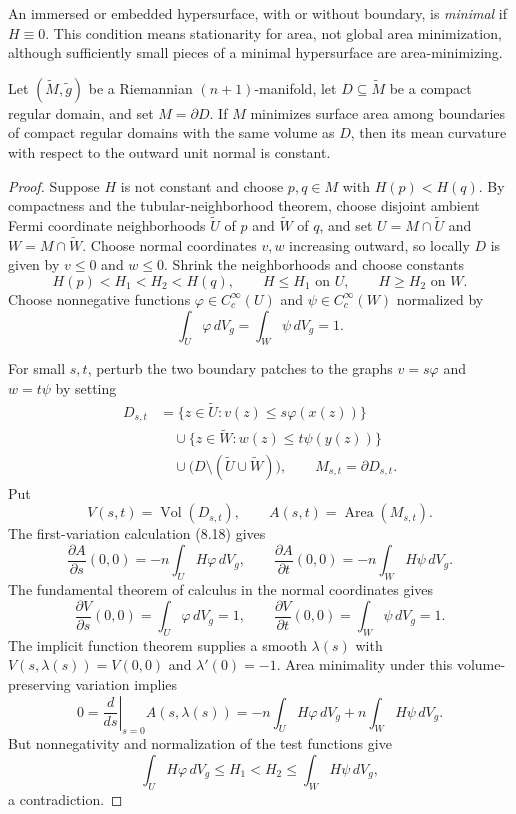 An immersed or embedded hypersurface, with or without boundary, is
\emph{minimal} if $H\equiv0$. This condition means stationarity for area, not
global area minimization, although sufficiently small pieces of a minimal
hypersurface are area-minimizing.

\begin{theorem}
\label{thm:constant-mean-curvature-isoperimetric}

Let $(\widetilde M,\widetilde g)$ be a Riemannian $(n+1)$-manifold, let
$D\subseteq\widetilde M$ be a compact regular domain, and set $M=\partial D$.
If $M$ minimizes surface area among boundaries of compact regular domains with
the same volume as $D$, then its mean curvature with respect to the outward
unit normal is constant.
\end{theorem}

\begin{proof}
\sketch Suppose $H$ is not constant and choose $p,q\in M$ with
$H(p)<H(q)$. By compactness and the tubular-neighborhood theorem, choose
disjoint ambient Fermi coordinate neighborhoods $\widetilde U$ of $p$ and
$\widetilde W$ of $q$, and set
$U=M\cap\widetilde U$ and $W=M\cap\widetilde W$. Choose normal coordinates
$v,w$ increasing outward, so locally $D$ is given by $v\leq0$ and $w\leq0$.
Shrink the neighborhoods and choose constants
\[
H(p)<H_1<H_2<H(q),
\qquad H\leq H_1\text{ on }U,
\qquad H\geq H_2\text{ on }W.
\]
Choose nonnegative functions
$\varphi\in C_c^\infty(U)$ and $\psi\in C_c^\infty(W)$ normalized by
\[
\int_U\varphi\,dV_g=\int_W\psi\,dV_g=1.
\]

For small $s,t$, perturb the two boundary patches to the graphs
$v=s\varphi$ and $w=t\psi$ by setting
\begin{align*}
D_{s,t}
&=\{z\in\widetilde U:v(z)\leq s\varphi(x(z))\}\\
&\quad\cup\{z\in\widetilde W:w(z)\leq t\psi(y(z))\}\\
&\quad\cup\bigl(D\setminus(\widetilde U\cup\widetilde W)\bigr),
\qquad M_{s,t}=\partial D_{s,t}.
\end{align*}
Put
\[
V(s,t)=\operatorname{Vol}(D_{s,t}),
\qquad A(s,t)=\operatorname{Area}(M_{s,t}).
\]
The first-variation calculation (8.18) gives
\[
\frac{\partial A}{\partial s}(0,0)
=-n\int_UH\varphi\,dV_g,
\qquad
\frac{\partial A}{\partial t}(0,0)
=-n\int_WH\psi\,dV_g.
\]
The fundamental theorem of calculus in the normal coordinates gives
\[
\frac{\partial V}{\partial s}(0,0)
=\int_U\varphi\,dV_g=1,
\qquad
\frac{\partial V}{\partial t}(0,0)
=\int_W\psi\,dV_g=1.
\]
The implicit function theorem supplies a smooth $\lambda(s)$ with
$V(s,\lambda(s))=V(0,0)$ and $\lambda'(0)=-1$. Area minimality under this
volume-preserving variation implies
\[
0=\left.\frac d{ds}\right|_{s=0}A(s,\lambda(s))
=-n\int_UH\varphi\,dV_g+n\int_WH\psi\,dV_g.
\]
But nonnegativity and normalization of the test functions give
\[
\int_UH\varphi\,dV_g
\leq H_1<H_2
\leq\int_WH\psi\,dV_g,
\]
a contradiction.
\end{proof}

